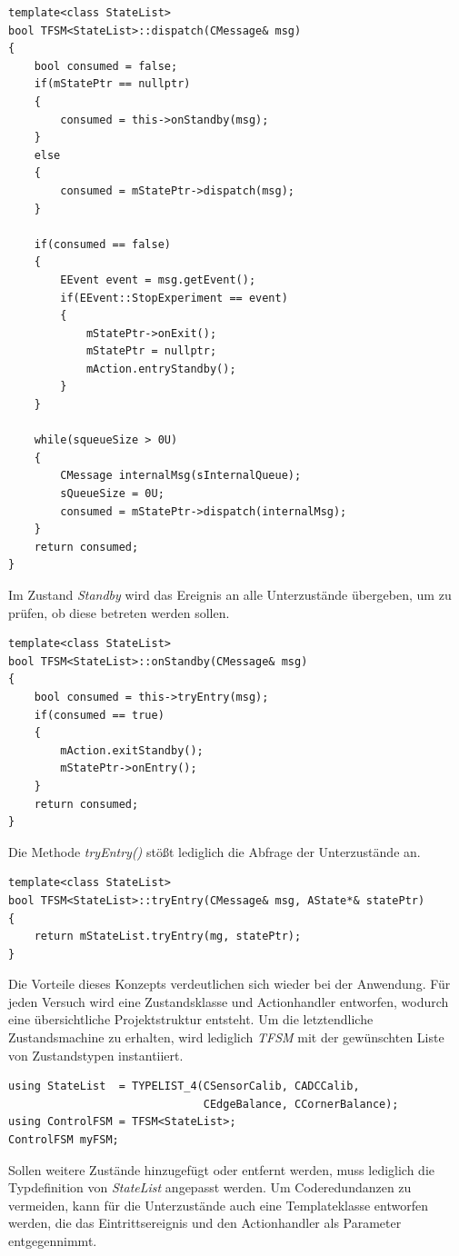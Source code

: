 \begin{lstlisting}[caption={Definition der Methode \textit{dispatch()}},captionpos=b]
template<class StateList>
bool TFSM<StateList>::dispatch(CMessage& msg)
{
	bool consumed = false;
	if(mStatePtr == nullptr)
	{
		consumed = this->onStandby(msg);
	}
	else
	{
		consumed = mStatePtr->dispatch(msg);
	}
	
	if(consumed == false)
	{
		EEvent event = msg.getEvent();
		if(EEvent::StopExperiment == event)
		{
			mStatePtr->onExit();
			mStatePtr = nullptr;
			mAction.entryStandby();
		}
	}
	
	while(squeueSize > 0U)
	{
		CMessage internalMsg(sInternalQueue);
		sQueueSize = 0U;
		consumed = mStatePtr->dispatch(internalMsg);
	}
	return consumed;
}
\end{lstlisting}
Im Zustand \textit{Standby} wird das Ereignis an alle Unterzustände übergeben, um zu prüfen, ob diese betreten werden sollen. 
\begin{lstlisting}[caption={Implementierung der Methode \textit{onStandby()}},captionpos=b]
template<class StateList>
bool TFSM<StateList>::onStandby(CMessage& msg)
{
	bool consumed = this->tryEntry(msg);
	if(consumed == true)
	{
		mAction.exitStandby();
		mStatePtr->onEntry();
	}
	return consumed;
}
\end{lstlisting}
Die Methode \textit{tryEntry()} stößt lediglich die Abfrage der Unterzustände an.
\begin{lstlisting}[caption={Implementierung der Methode \textit{tryEntry()}},captionpos=b]
template<class StateList>
bool TFSM<StateList>::tryEntry(CMessage& msg, AState*& statePtr)
{
	return mStateList.tryEntry(mg, statePtr);
}
\end{lstlisting}
Die Vorteile dieses Konzepts verdeutlichen sich wieder bei der Anwendung. Für jeden Versuch wird eine Zustandsklasse und Actionhandler entworfen, wodurch eine übersichtliche Projektstruktur entsteht. Um die letztendliche Zustandsmachine zu erhalten, wird lediglich \textit{TFSM} mit der gewünschten Liste von Zustandstypen instantiiert.
\begin{lstlisting}[caption={Beispielhafte Instantiierung der Zustandsmaschine},captionpos=b]
using StateList  = TYPELIST_4(CSensorCalib, CADCCalib, 
                              CEdgeBalance, CCornerBalance);
using ControlFSM = TFSM<StateList>;
ControlFSM myFSM;
\end{lstlisting}
Sollen weitere Zustände hinzugefügt oder entfernt werden, muss lediglich die Typdefinition von \textit{StateList} angepasst werden. Um Coderedundanzen zu vermeiden, kann für die Unterzustände auch eine Templateklasse entworfen werden, die das Eintrittsereignis und den Actionhandler als Parameter entgegennimmt. 
